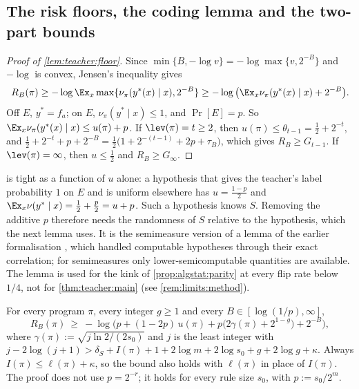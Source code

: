 \subsection{The risk floors, the coding lemma and the two-part bounds}\label{app:teacher:lemmas}

\begin{proof}[Proof of \cref{lem:teacher:floor}]
Since $\min\{B,-\log v\}=-\log\max\{v,2^{-B}\}$ and $-\log$ is convex, Jensen's inequality gives
\[
R_B(\pi)\ge-\log\Ex_x\max\{\nu_\pi(y^*(x)\mid x),2^{-B}\}\ge-\log\big(\Ex_x\nu_\pi(y^*(x)\mid x)+2^{-B}\big).
\]
Off $E$, $y^*=f_a$; on $E$, $\nu_\pi(y^*\mid x)\le1$, and $\Pr[E]=p$. So $\Ex_x\nu_\pi(y^*(x)\mid x)\le u(\pi)+p$. If $\lev(\pi)=t\ge2$, then $u(\pi)\le\theta_{t-1}=\frac12+2^{-t}$, and $\frac12+2^{-t}+p+2^{-B}=\frac12\big(1+2^{-(t-1)}+2p+\tau_B\big)$, which gives $R_B\ge G_{t-1}$. If $\lev(\pi)=\infty$, then $u\le\frac12$ and $R_B\ge G_\infty$.
\end{proof}

 is tight as a function of $u$ alone: a hypothesis that gives the teacher's label probability $1$ on $E$ and is uniform elsewhere has $u=\frac{1-p}2$ and $\Ex_x\nu(y^*\mid x)=\frac12+\frac p2=u+p$. Such a hypothesis knows $S$. Removing the additive $p$ therefore needs the randomness of $S$ relative to the hypothesis, which the next lemma uses. It is the semimeasure version of a lemma of the earlier formalisation \citep[section ``Simplicity and normativity from imitation'']{claude2026whatfollows}, which handled computable hypotheses through their exact correlation; for semimeasures only lower-semicomputable quantities are available. The lemma is used for the kink of \cref{prop:algstat:parity} at every flip rate below $1/4$, not for \cref{thm:teacher:main} (see \cref{rem:limits:method}).

\begin{lemma}\label{lem:teacher:sharpfloor}
For every program $\pi$, every integer $g\ge1$ and every $B\in[\log(1/p),\infty]$,
\[
R_B(\pi)\ \ge\ -\log\Big(p+(1-2p)\,u(\pi)+p\big(2\gamma(\pi)+2^{1-g}\big)+2^{-B}\Big),
\]
where $\gamma(\pi):=\sqrt{j\ln2/(2s_0)}$ and $j$ is the least integer with $j-2\log(j+1)>\delta_S+I(\pi)+1+2\log m+2\log s_0+g+2\log g+\kappa$. Always $I(\pi)\le\ell(\pi)+\kappa$, so the bound also holds with $\ell(\pi)$ in place of $I(\pi)$. The proof does not use $p=2^{-r}$; it holds for every rule size $s_0$, with $p:=s_0/2^m$.
\end{lemma}

